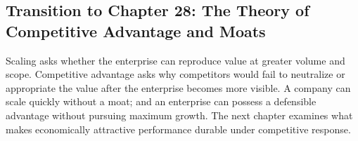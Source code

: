 \subsection*{Transition to Chapter 28: The Theory of Competitive Advantage and Moats}
\label{sec:transition_to_ch28}

Scaling asks whether the enterprise can reproduce value at greater volume and scope. Competitive advantage asks why competitors would fail to neutralize or appropriate the value after the enterprise becomes more visible. A company can scale quickly without a moat; and an enterprise can possess a defensible advantage without pursuing maximum growth. The next chapter examines what makes economically attractive performance durable under competitive response.
